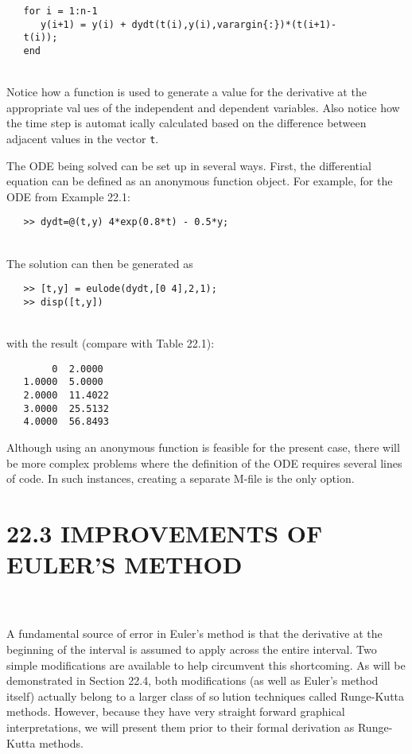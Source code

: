\begin{verbatim}
   for i = 1:n-1 
      y(i+1) = y(i) + dydt(t(i),y(i),varargin{:})*(t(i+1)-
   t(i));
   end
\end{verbatim}\\
Notice how a function is used to generate a value for the derivative at the appropriate values of the independent and dependent variables. Also notice how the time step is automatically calculated based on the difference between adjacent values in the vector \texttt{t}.

The ODE being solved can be set up in several ways. First, the differential equation can
be defined as an anonymous function object. For example, for the ODE from Example 22.1:

\begin{verbatim}
   >> dydt=@(t,y) 4*exp(0.8*t) - 0.5*y;
\end{verbatim}\\
The solution can then be generated as

\begin{verbatim}
   >> [t,y] = eulode(dydt,[0 4],2,1);
   >> disp([t,y])
\end{verbatim}\\
with the result (compare with Table 22.1):

\begin{verbatim}
        0  2.0000
   1.0000  5.0000
   2.0000  11.4022
   3.0000  25.5132
   4.0000  56.8493
\end{verbatim}

Although using an anonymous function is feasible for the present case, there will be
more complex problems where the definition of the ODE requires several lines of code. In
such instances, creating a separate M-file is the only option.

\vspace{0,3in}
\chapter{22.3 IMPROVEMENTS OF EULER’S METHOD}
\vspace{0,1in}
\hline\\
\vspace{0,1in}
\\
A fundamental source of error in Euler’s method is that the derivative at the beginning of
the interval is assumed to apply across the entire interval. Two simple modifications are
available to help circumvent this shortcoming. As will be demonstrated in Section 22.4,
both modifications (as well as Euler’s method itself) actually belong to a larger class of solution techniques called Runge-Kutta methods. However, because they have very straightforward graphical interpretations, we will present them prior to their formal derivation as
Runge-Kutta methods.

